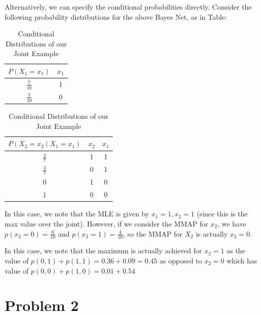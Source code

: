 \documentclass[12pt]{article}
\begin{document}
Alternatively, we can specify the conditional probabilities directly. Consider the following probability distributions for the above Bayes Net, as in Table:
\begin{table}[!h]
\centering
\begin{tabular}{|c|c|}
\hline
$P(X_1 = x_1)$ & $x_1$ \\ \hline
$\frac{7}{10}$            & 1    \\ \hline
$\frac{3}{10}$            & 0    \\ \hline
\end{tabular}
\quad
\begin{tabular}{|c|c|c|}
\hline
$P(X_2 = x_2 \mid X_1 = x_1)$ & $x_2$ & $x_1$ \\ \hline
$\frac{4}{7}$                          & 1    & 1    \\ \hline
$\frac{3}{7}$                          & 0    & 1    \\ \hline
0                          & 1    & 0    \\ \hline
$1$                          & 0    & 0    \\ \hline
\end{tabular}
\caption{Conditional Distributions of our Joint Example}
\label{table:conditional_distributions}
\end{table}

In this case, we note that the MLE is given by $x_1 = 1, x_2 = 1$ (since this is the max value over the joint). However, if we consider the MMAP for $x_2$, we have $p(x_2 = 0) = \frac{6}{10}$ and $p(x_2 = 1) = \frac{4}{10}$, so the MMAP for $X_2$ is actually $x_2 = 0$.

In this case, we note that the maximum is actually achieved for $x_2 = 1$ as the value of $p(0,1) + p(1,1) = 0.36 + 0.09 = 0.45$ as opposed to $x_2 = 0$ which has value of $p(0,0) + p(1,0) = 0.01 + 0.54$

\pagebreak
\section*{Problem 2}
\end{document}

